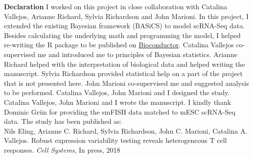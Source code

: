 \begin{Comment}
\textbf{Declaration} I worked on this project in close collaboration with Catalina Vallejos, Arianne Richard, Sylvia Richardson and John Marioni. In this project, I extended the existing Bayesian framework (BASiCS) to model scRNA-Seq data. Besides calculating the underlying math and programming the model, I helped re-writing the R package to be published on \href{https://bioconductor.org/packages/release/bioc/html/BASiCS.html}{Bioconductor}. Catalina Vallejos co-supervised me and introduced me to principles of Bayesian statistics. Arianne Richard helped with the interpretation of biological data and helped writing the manuscript. Sylvia Richardson provided statistical help on a part of the project that is not presented here. John Marioni co-supervised me and suggested analysis to be performed. Catalina Vallejos, John Marioni and I designed the study. Catalina Vallejos, John Marioni and I wrote the manuscript. I kindly thank Dominic Gr\"un for providing the smFISH data matched to mESC scRNA-Seq data. The study has been published as:\\

Nils Eling, Arianne C. Richard, Sylvia Richardson, John C. Marioni, Catalina A. Vallejos. Robust expression variability testing reveals heterogeneous T cell responses. \emph{Cell Systems}, In press, 2018 
\end{Comment}

\vspace*{\fill}

\newpage


\newpage

\newpage


